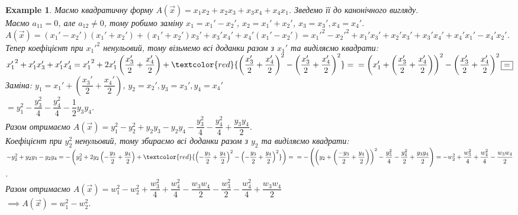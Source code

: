 \documentclass[a4paper, 10pt]{article}
\theoremstyle{theoremdd}
\newtheorem{example}[theorem]{Example}
\begin{document}
\begin{example}
Маємо квадратичну форму $A(\vec{x}) = x_1 x_2 + x_2 x_3 + x_3 x_4 + x_4 x_1$. Зведемо її до канонічного вигляду.\\
Маємо $a_{11} = 0$, але $a_{12} \neq 0$, тому робимо заміну $x_1 = x_1' - x_2'$, $x_2 = x_1' + x_2'$, $x_3 = x_3', x_4 = x_4'$.\\
$A(\vec{x}) = (x_1'-x_2')(x_1'+x_2') + (x_1'+x_2')x_3' + x_3' x_4' + x_4' (x_1' - x_2') = {x_1'}^2 - {x_2'}^2 + x_1'x_3' + x_2'x_3' + x_3' x_4' + x_4' x_1' - x_4' x_2'$.\\
Тепер коефіцієнт при ${x_1'}^2$ ненульовий, тому візьмемо всі доданки разом з $x_1'$ та виділяємо квадрати:\\
${x_1'}^2 + x_1'x_3' + x_1'x_4' = {x_1'}^2 + 2 x_1' \left( \dfrac{x_3'}{2} + \dfrac{x_4'}{2} \right) + \textcolor{red}{\left( \dfrac{x_3'}{2} + \dfrac{x_4'}{2} \right)^2 - \left(\dfrac{x_3'}{2} + \dfrac{x_4'}{2} \right)^2} = \\
= \left( x_1' + \left( \dfrac{x_3'}{2} + \dfrac{x_4'}{2} \right) \right)^2 - \left( \dfrac{x_3'}{2} + \dfrac{x_4'}{2} \right)^2 \boxed{=}$\\
Заміна: $y_1 = x_1' + \left( \dfrac{x_3'}{2} + \dfrac{x_4'}{2} \right)$, $y_2 = x_2', y_3 = x_3', y_4 = x_4'$\\
$\boxed{=} y_1^2  - \dfrac{y_3^2}{4} - \dfrac{y_4^2}{4} - \dfrac{1}{2}y_3y_4$.\\
Разом отримаємо $A(\vec{x}) = y_1^2 - y_2^2 + y_2y_3 - y_2y_4 - \dfrac{y_3^2}{4} - \dfrac{y_4^2}{4} + \dfrac{y_3y_4}{2}$.\\
Коефіцієнт при $y_2^2$ ненульовий, тому збираємо всі доданки разом з $y_2$ та виділяємо квадрати:\\
$-y_2^2 + y_2y_3 - y_2y_4 = -\left(y_2^2 +2y_2 \left( -\dfrac{y_3}{2} + \dfrac{y_4}{2} \right) + \textcolor{red}{\left( -\dfrac{y_3}{2} + \dfrac{y_4}{2} \right)^2 - \left( -\dfrac{y_3}{2} + \dfrac{y_4}{2} \right)^2} \right) = \\ 
= - \left( \left( y_2 + \left( \dfrac{-y_3}{2} + \dfrac{y_4}{2} \right) \right)^2 - \dfrac{y_3^2}{4} - \dfrac{y_4^2}{2} + \dfrac{y_3y_4}{2} \right) = -w_2^2 + \dfrac{w_3^2}{4} + \dfrac{w_4^2}{4} - \dfrac{w_3 w_4}{2}$.\\
Разом отримаємо $A(\vec{x}) = w_1^2 - w_2^2 + \dfrac{w_3^2}{4} + \dfrac{w_4^2}{4} - \dfrac{w_3w_4}{2} - \dfrac{w_3^2}{2} - \dfrac{w_4^2}{4} + \dfrac{w_3w_4}{2}$\\
$\implies A(\vec{x}) = w_1^2 - w_2^2$.
\end{example}
\end{document}
